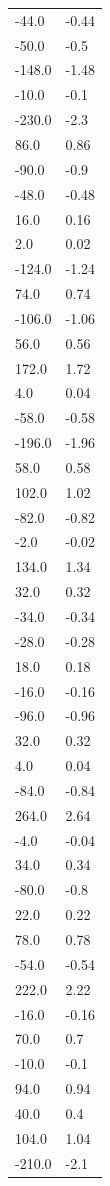 \begin{longtable}{ll}
-44.0 & -0.44 \\
-50.0 & -0.5 \\
-148.0 & -1.48 \\
-10.0 & -0.1 \\
-230.0 & -2.3 \\
86.0 & 0.86 \\
-90.0 & -0.9 \\
-48.0 & -0.48 \\
16.0 & 0.16 \\
2.0 & 0.02 \\
-124.0 & -1.24 \\
74.0 & 0.74 \\
-106.0 & -1.06 \\
56.0 & 0.56 \\
172.0 & 1.72 \\
4.0 & 0.04 \\
-58.0 & -0.58 \\
-196.0 & -1.96 \\
58.0 & 0.58 \\
102.0 & 1.02 \\
-82.0 & -0.82 \\
-2.0 & -0.02 \\
134.0 & 1.34 \\
32.0 & 0.32 \\
-34.0 & -0.34 \\
-28.0 & -0.28 \\
18.0 & 0.18 \\
-16.0 & -0.16 \\
-96.0 & -0.96 \\
32.0 & 0.32 \\
4.0 & 0.04 \\
-84.0 & -0.84 \\
264.0 & 2.64 \\
-4.0 & -0.04 \\
34.0 & 0.34 \\
-80.0 & -0.8 \\
22.0 & 0.22 \\
78.0 & 0.78 \\
-54.0 & -0.54 \\
222.0 & 2.22 \\
-16.0 & -0.16 \\
70.0 & 0.7 \\
-10.0 & -0.1 \\
94.0 & 0.94 \\
40.0 & 0.4 \\
104.0 & 1.04 \\
-210.0 & -2.1 \\

\end{longtable}
